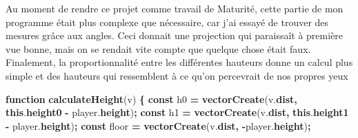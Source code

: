 \documentclass[11pt,french,a4paper,]{article}
\newenvironment{Shaded}{\begin{snugshade}}{\end{snugshade}}
\newcommand{\AttributeTok}[1]{\textcolor[rgb]{0.00,0.36,0.77}{\textbf{#1}}}
\newcommand{\KeywordTok}[1]{\textcolor[rgb]{0.68,0.35,0.62}{\textbf{#1}}}
\newcommand{\NormalTok}[1]{#1}
\newcommand{\OperatorTok}[1]{\textcolor[rgb]{0.81,0.36,0.00}{\textbf{#1}}}
\newcommand{\VariableTok}[1]{\textcolor[rgb]{0.90,0.33,0.00}{#1}}
\begin{document}
Au moment de rendre ce projet comme travail de Maturité, cette partie de
mon programme était plus complexe que nécessaire, car j'ai essayé de
trouver des mesures grâce aux angles. Ceci donnait une projection qui
paraissaît à première vue bonne, mais on se rendait vite compte que
quelque chose était faux. Finalement, la proportionnalité entre les
différentes hauteurs donne un calcul plus simple et des hauteurs qui
ressemblent à ce qu'on percevrait de nos propres yeux

\begin{Shaded}
\begin{Highlighting}[]
\KeywordTok{function} \AttributeTok{calculateHeight}\NormalTok{(v) }\OperatorTok{\{}
    \KeywordTok{const}\NormalTok{ h0 }\OperatorTok{=} \AttributeTok{vectorCreate}\NormalTok{(}\VariableTok{v}\NormalTok{.}\AttributeTok{dist}\OperatorTok{,} \KeywordTok{this}\NormalTok{.}\AttributeTok{height0} \OperatorTok{-} \VariableTok{player}\NormalTok{.}\AttributeTok{height}\NormalTok{)}\OperatorTok{;}
    \KeywordTok{const}\NormalTok{ h1 }\OperatorTok{=} \AttributeTok{vectorCreate}\NormalTok{(}\VariableTok{v}\NormalTok{.}\AttributeTok{dist}\OperatorTok{,} \KeywordTok{this}\NormalTok{.}\AttributeTok{height1} \OperatorTok{-} \VariableTok{player}\NormalTok{.}\AttributeTok{height}\NormalTok{)}\OperatorTok{;}
    \KeywordTok{const}\NormalTok{ floor }\OperatorTok{=} \AttributeTok{vectorCreate}\NormalTok{(}\VariableTok{v}\NormalTok{.}\AttributeTok{dist}\OperatorTok{,} \OperatorTok{-}\VariableTok{player}\NormalTok{.}\AttributeTok{height}\NormalTok{)}\OperatorTok{;} 


\end{Highlighting}
\end{Shaded}
\end{document}
